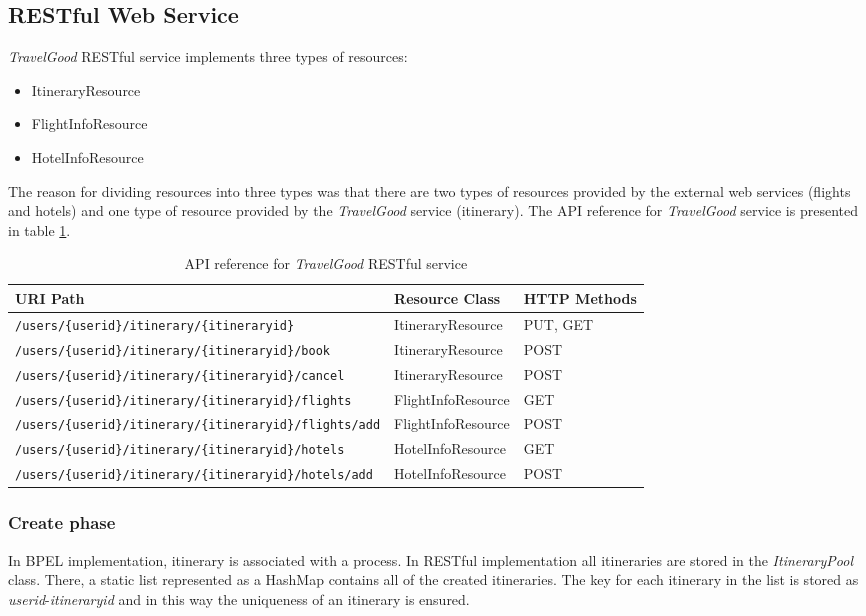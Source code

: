 \subsection{RESTful Web Service}
\textit{TravelGood} RESTful service implements three types of resources:
\begin{itemize}
\item ItineraryResource
\item FlightInfoResource
\item HotelInfoResource
\end{itemize}
The reason for dividing resources into three types was that there are two types of resources provided by the external web services (flights and hotels) and one type of resource provided by the \textit{TravelGood} service (itinerary). The API reference for \textit{TravelGood} service is presented in table \ref{tableAPIref}.

\begin{table}[H]
\begin{adjustwidth}{-1cm}{-1cm}
\centering
\begin{tabular}{|l|l|l|} \hline
\textbf{URI Path} & \textbf{Resource Class} & \textbf{HTTP Methods} \\ \hline
\texttt{/users/\{userid\}/itinerary/\{itineraryid\}} & ItineraryResource & PUT, GET \\ \hline
\texttt{/users/\{userid\}/itinerary/\{itineraryid\}/book} & ItineraryResource & POST \\ \hline
\texttt{/users/\{userid\}/itinerary/\{itineraryid\}/cancel} & ItineraryResource & POST \\ \hline
\texttt{/users/\{userid\}/itinerary/\{itineraryid\}/flights} & FlightInfoResource & GET \\ \hline
\texttt{/users/\{userid\}/itinerary/\{itineraryid\}/flights/add} & FlightInfoResource & POST \\ \hline
\texttt{/users/\{userid\}/itinerary/\{itineraryid\}/hotels} & HotelInfoResource & GET \\ \hline
\texttt{/users/\{userid\}/itinerary/\{itineraryid\}/hotels/add} & HotelInfoResource & POST \\ \hline
\end{tabular}
\caption{API reference for \textit{TravelGood} RESTful service}
\label{tableAPIref}
\end{adjustwidth}
\end{table}

\subsubsection*{Create phase}
In BPEL implementation, itinerary is associated with a process. In RESTful implementation all itineraries are stored in the \textit{ItineraryPool} class. There, a static list represented as a HashMap contains all of the created itineraries. The key for each itinerary in the list is stored as \textit{userid}-\textit{itineraryid} and in this way the uniqueness of an itinerary is ensured.

